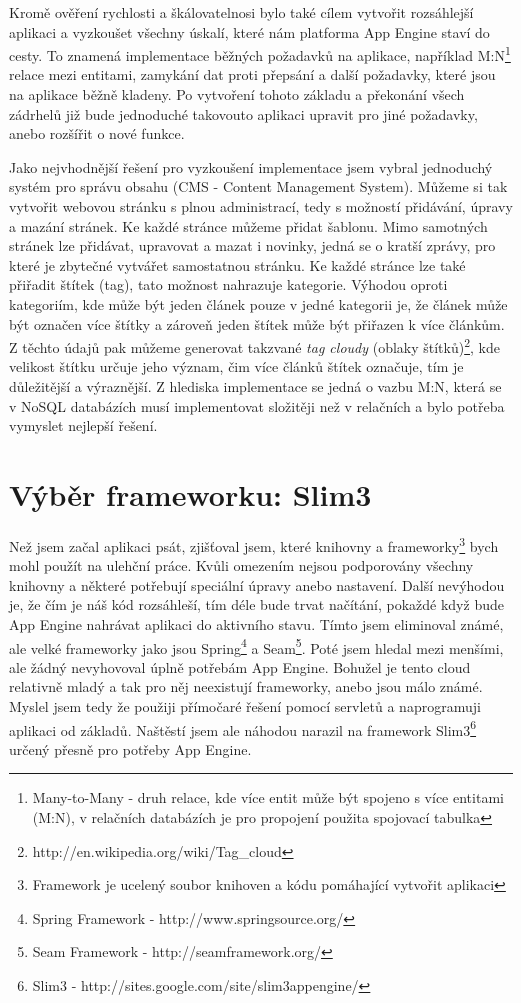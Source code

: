 Kromě ověření rychlosti a škálovatelnosi bylo také cílem vytvořit rozsáhlejší aplikaci a vyzkoušet všechny úskalí, které nám platforma App Engine staví do cesty. To znamená implementace běžných požadavků na aplikace, například M:N\footnote{Many-to-Many - druh relace, kde více entit může být spojeno s více entitami (M:N), v relačních databázích je pro propojení použita spojovací tabulka} relace mezi entitami, zamykání dat proti přepsání a další požadavky, které jsou na aplikace běžně kladeny. Po vytvoření tohoto základu a překonání všech zádrhelů již bude jednoduché takovouto aplikaci upravit pro jiné požadavky, anebo rozšířit o nové funkce.

Jako nejvhodnější řešení pro vyzkoušení implementace jsem vybral jednoduchý systém pro správu obsahu (CMS - Content Management System). Můžeme si tak vytvořit webovou  stránku s plnou administrací, tedy s možností přidávání, úpravy a mazání stránek. Ke každé stránce můžeme přidat šablonu. Mimo samotných stránek lze přidávat, upravovat a mazat i novinky, jedná se o kratší zprávy, pro které je zbytečné vytvářet samostatnou stránku. Ke každé stránce lze také přiřadit štítek (tag), tato možnost nahrazuje kategorie. Výhodou oproti kategoriím, kde může být jeden článek pouze v jedné kategorii je, že článek může být označen více štítky a zároveň jeden štítek může být přiřazen k více článkům. Z těchto údajů pak můžeme generovat takzvané \emph{tag cloudy} (oblaky štítků)\footnote{http://en.wikipedia.org/wiki/Tag\_cloud}, kde velikost štítku určuje jeho význam, čim více článků štítek označuje, tím je důležitější a výraznější. Z hlediska implementace se jedná o vazbu M:N, která se v NoSQL databázích musí implementovat složitěji než v relačních a bylo potřeba vymyslet nejlepší řešení.

\section{Výběr frameworku: Slim3}
Než jsem začal aplikaci psát, zjišťoval jsem, které knihovny a frameworky\footnote{Framework je ucelený soubor knihoven a kódu pomáhající vytvořit aplikaci} bych mohl použít na ulehční práce. Kvůli omezením nejsou podporovány všechny knihovny a některé potřebují speciální úpravy anebo nastavení. Další nevýhodou je, že čím je náš kód rozsáhleší, tím déle bude trvat načítání, pokaždé když bude App Engine nahrávat aplikaci do aktivního stavu. Tímto jsem eliminoval známé, ale velké frameworky jako jsou Spring\footnote{Spring Framework - http://www.springsource.org/} a Seam\footnote{Seam Framework - http://seamframework.org/}. Poté jsem hledal mezi menšími, ale žádný nevyhovoval úplně potřebám App Engine. Bohužel je tento cloud relativně mladý a tak pro něj neexistují frameworky, anebo jsou málo známé. Myslel jsem tedy že použiji přímočaré řešení pomocí servletů a naprogramuji aplikaci od základů. Naštěstí jsem ale náhodou narazil na framework Slim3\footnote{Slim3 - http://sites.google.com/site/slim3appengine/} určený přesně pro potřeby App Engine.

